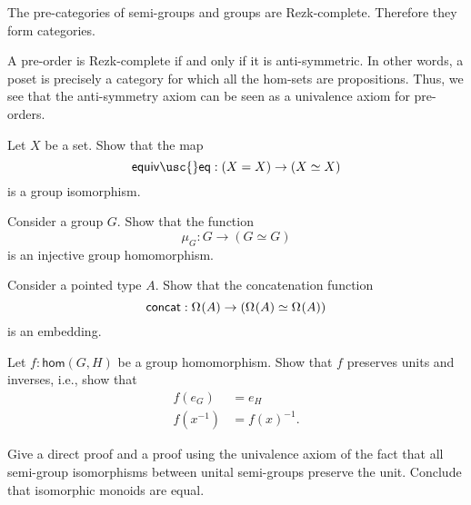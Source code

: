 \begin{eg}
  The pre-categories of semi-groups and groups are Rezk-complete. Therefore they form categories.
\end{eg}

\begin{eg}
  A pre-order is Rezk-complete if and only if it is anti-symmetric. In other words, a poset is precisely a category for which all the hom-sets are propositions. Thus, we see that the anti-symmetry axiom can be seen as a univalence axiom for pre-orders.
\end{eg}

\begin{exercises}
\item Let $X$ be a set. Show that the map
  \begin{equation*}
    \mathsf{equiv\usc{}eq} : (X=X)\to (\eqv{X}{X})
  \end{equation*}
  is a group isomorphism.
\item
  \begin{subexenum}
  \item Consider a group $G$. Show that the function
    \begin{equation*}
      \mu_G:G\to (G\simeq G)
    \end{equation*}
    is an injective group homomorphism.
  \item Consider a pointed type $A$. Show that the concatenation function
    \begin{equation*}
      \mathsf{concat}:\Omega^{}(A)\to (\Omega^{}(A)\simeq\Omega^{}(A))
    \end{equation*}
    is an embedding.
  \end{subexenum}
\item Let $f:\mathsf{hom}(G,H)$ be a group homomorphism. Show that $f$ preserves units and inverses, i.e., show that
  \begin{align*}
    f(e_G) & = e_H \\
    f(x^{-1}) & = f(x)^{-1}.
  \end{align*}
\item Give a direct proof and a proof using the univalence axiom of the fact that all semi-group isomorphisms between unital semi-groups preserve the unit. Conclude that isomorphic monoids are equal.

\end{exercises}
